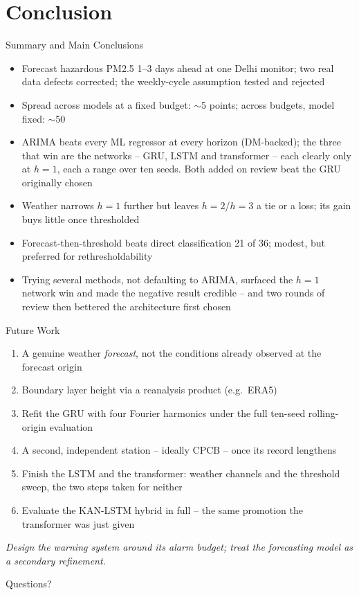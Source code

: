 \documentclass[12pt,aspectratio=169]{beamer}
\begin{document}
\section{Conclusion}

\begin{frame}{Summary and Main Conclusions}
  \begin{itemize}
    \item Forecast hazardous PM2.5 1--3 days ahead at one Delhi monitor;
      two real data defects corrected; the weekly-cycle assumption tested
      and rejected
    \item Spread across models at a fixed budget: $\sim$5 points;
      across budgets, model fixed: $\sim$50
    \item ARIMA beats every ML regressor at every horizon (DM-backed);
      the three that win are the networks -- GRU, LSTM and transformer --
      each clearly only at $h=1$, each a range over ten seeds. Both added
      on review beat the GRU originally chosen
    \item Weather narrows $h=1$ further but leaves $h=2$/$h=3$ a tie or
      a loss; its gain buys little once thresholded
    \item Forecast-then-threshold beats direct classification 21 of 36;
      modest, but preferred for rethresholdability
    \item Trying several methods, not defaulting to ARIMA, surfaced the
      $h=1$ network win and made the negative result credible -- and two
      rounds of review then bettered the architecture first chosen
  \end{itemize}
\end{frame}

\begin{frame}{Future Work}
  \begin{enumerate}
    \item A genuine weather \emph{forecast}, not the conditions already
      observed at the forecast origin
    \item Boundary layer height via a reanalysis product (e.g.\ ERA5)
    \item Refit the GRU with four Fourier harmonics under the full
      ten-seed rolling-origin evaluation
    \item A second, independent station -- ideally CPCB -- once its
      record lengthens
    \item Finish the LSTM and the transformer: weather channels and the
      threshold sweep, the two steps taken for neither
    \item Evaluate the KAN-LSTM hybrid in full -- the same promotion the
      transformer was just given
  \end{enumerate}
  \vspace{6pt}
  \centering
  \textit{Design the warning system around its alarm budget; treat the
  forecasting model as a secondary refinement.}
\end{frame}

\begin{frame}
  \centering
  \Large Questions?
\end{frame}
\end{document}

